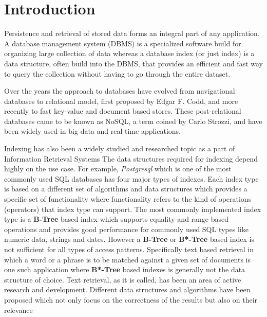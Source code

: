 \chapter{Introduction}
\label{chap:intro}
Persistence and retrieval of stored data forms an integral part of any application.
A database management system (DBMS) is a specialized software build for organizing large collection of data
whereas a database index (or just index) is a data structure, often build into the DBMS,
that provides an efficient and fast way to query the collection without having to go through the entire dataset.

Over the years the approach to databases have evolved from navigational databases
to relational model, first proposed by Edgar F. Codd\cite{codd1970relational},
and more recently to fast key-value and document based stores.
These post-relational databases came to be known as NoSQL, a term coined by Carlo Strozzi\cite{strozziNoSQL},
and have been widely used in big data and real-time applications.

Indexing has also been a widely studied and researched topic as a part of Information Retrieval Systems
The data structures required for indexing depend highly on the use case.
For example, \textit{Postgresql} which is one of the most commonly used SQL databases has four major types of indexes.
Each index type is based on a different set of algorithms and data structures which provides a specific set of functionality where functionality refers to the kind of operations (operators) that index type can support.
The most commonly implemented index type is a \textbf{B-Tree} based index which supports equality and range based
operations and provides good performance for commonly used SQL types like numeric data, strings and dates.
However a \textbf{B-Tree} or \textbf{B*-Tree} based index is not sufficient for all types of access patterns.
Specifically text based retrieval in which a word or a phrase is to be matched against a given set of documents is one
such application where \textbf{B*-Tree} based indexes is generally not the data structure of choice.
Text retrieval, as it is called, has been an area of active research and development.
Different data structures and algorithms have been proposed which not only focus on the correctness of the results
but also on their relevance

